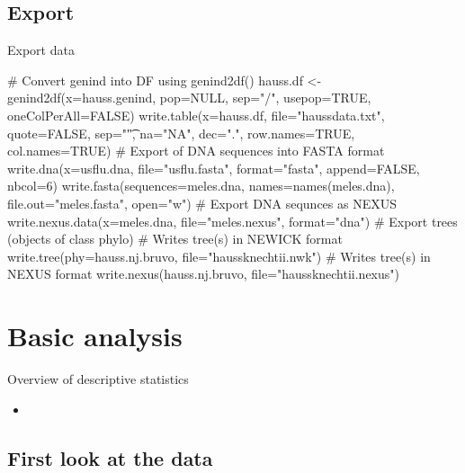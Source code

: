 \documentclass[compress, ucs, xelatex, 11pt, xcolor=svgnames,
  hyperref={
    bookmarks=true,
    unicode=true,
    colorlinks=true,
    pdftitle={Molecular data in R},
    plainpages=false,
    pdfauthor={Vojtech Zeisek},
    pdfsubject={Course about phylogeny and evolution in R},
    pdfcreator={XeLaTeX},
    pdfkeywords={R, evolution, phylogeny, molecular data},
    linkcolor=Tomato,
    anchorcolor=SaddleBrown,
    citecolor=Goldenrod,
    filecolor=DarkMagenta,
    menucolor=Sienna,
    urlcolor=DarkTurquoise,
    pdftex},
  url={hyphens, lowtilde} %
  ]{beamer}
\begin{document}
\subsection{Export}

\begin{frame}[fragile]{Export data}
  \begin{spluscode}
    # Convert genind into DF using genind2df()
    hauss.df <- genind2df(x=hauss.genind, pop=NULL, sep="/",
      usepop=TRUE, oneColPerAll=FALSE)
    write.table(x=hauss.df, file="haussdata.txt", quote=FALSE,
      sep="\t", na="NA", dec=".", row.names=TRUE, col.names=TRUE)
    # Export of DNA sequences into FASTA format
    write.dna(x=usflu.dna, file="usflu.fasta", format="fasta",
      append=FALSE, nbcol=6)
    write.fasta(sequences=meles.dna, names=names(meles.dna),
      file.out="meles.fasta", open="w")
    # Export DNA sequnces as NEXUS
    write.nexus.data(x=meles.dna, file="meles.nexus", format="dna")
    # Export trees (objects of class phylo)
    # Writes tree(s) in NEWICK format
    write.tree(phy=hauss.nj.bruvo, file="haussknechtii.nwk")
    # Writes tree(s) in NEXUS format
    write.nexus(hauss.nj.bruvo, file="haussknechtii.nexus")
  \end{spluscode}
\end{frame}

\section{Basic analysis}

\begin{frame}{Overview of descriptive statistics} %
  \begin{itemize}
    \item 
  \end{itemize}
\end{frame}

\subsection{First look at the data}
\end{document}
